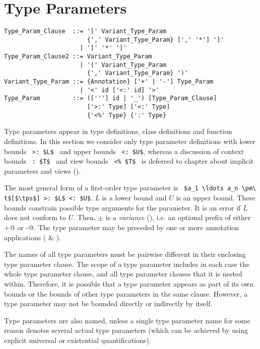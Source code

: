 \section{Type Parameters}

\syntax\begin{lstlisting}
Type_Param_Clause  ::= '[' Variant_Type_Param 
                       {',' Variant_Type_Param} [',' '*'] ']'
                     | '[' '*' ']'
Type_Param_Clause2 ::= Variant_Type_Param
                     | '(' Variant_Type_Param 
                       {',' Variant_Type_Param} ')'
Variant_Type_Param ::= {Annotation} ['+' | '-'] Type_Param
                     | '<' id ['<:' id] '>'
Type_Param         ::= (['''] id | '_') [Type_Param_Clause]
                       ['>:' Type] ['<:' Type]
                       {'<%' Type} {':' Type}
\end{lstlisting}

Type parameters appear in type definitions, class definitions and function definitions. In this section we consider only type parameter definitions with lower bounds ~\lstinline!>: $L$!~ and upper bounds ~\lstinline!<: $U$!, whereas a discussion of context bounds ~\lstinline!: $T$!~ and view bounds ~\lstinline!<% $T$!~ is deferred to chapter about implicit parameters and views ().

The most general form of a first-order type parameter is ~\lstinline!$a_1 \ldots a_n \pm\ t$[$\tps$] >: $L$ <: $U$!. $L$ is a lower bound and $U$ is an upper bound. These bounds constrain possible type arguments for the parameter. It is an error if $L$ does not conform to $U$. Then, $\pm$ is a {\em variance} (), i.e. an optional prefix of either \lstinline@+@ or \lstinline@-@. The type parameter may be preceded by one or more annotation applications ( \& ).

The names of all type parameters must be pairwise different in their enclosing type parameter clause. The scope of a type parameter includes in each case the whole type parameter clause, and all type parameter clauses that it is nested within. Therefore, it is possible that a type parameter appears as part of its own bounds or the bounds of other type parameters in the same clause. However, a type parameter may not be bounded directly or indirectly by itself. 

Type parameters are also named, unless a single type parameter name for some reason denotes several actual type parameters (which can be achieved by using explicit universal or existential quantifications). 

